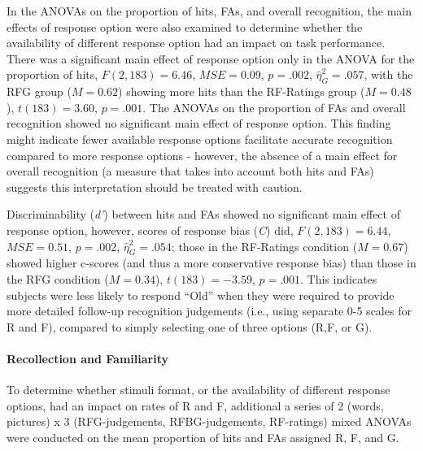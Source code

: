 \documentclass[
  11pt,
]{article}
\begin{document}
In the ANOVAs on the proportion of hits, FAs, and overall recognition,
the main effects of response option were also examined to determine
whether the availability of different response option had an impact on
task performance. There was a significant main effect of response option
only in the ANOVA for the proportion of hits, \(F(2, 183) = 6.46\),
\(\mathit{MSE} = 0.09\), \(p = .002\), \(\hat{\eta}^2_G = .057\), with
the RFG group (\(M = 0.62\)) showing more hits than the RF-Ratings group
(\(M = 0.48\)), \(t(183) = 3.60\), \(p = .001\). The ANOVAs on the
proportion of FAs and overall recognition showed no significant main
effect of response option. This finding might indicate fewer available
response options facilitate accurate recognition compared to more
response options - however, the absence of a main effect for overall
recognition (a measure that takes into account both hits and FAs)
suggests this interpretation should be treated with caution.

Discriminability (\emph{d'}) between hits and FAs showed no significant
main effect of response option, however, scores of response bias
(\emph{C}) did, \(F(2, 183) = 6.44\), \(\mathit{MSE} = 0.51\),
\(p = .002\), \(\hat{\eta}^2_G = .054\); those in the RF-Ratings
condition (\(M = 0.67\)) showed higher c-scores (and thus a more
conservative response bias) than those in the RFG condition
(\(M = 0.34\)), \(t(183) = -3.59\), \(p = .001\). This indicates
subjects were less likely to respond ``Old'' when they were required to
provide more detailed follow-up recognition judgements (i.e., using
separate 0-5 scales for R and F), compared to simply selecting one of
three options (R,F, or G).

\hypertarget{recollection-and-familiarity}{%
\paragraph{Recollection and
Familiarity}\label{recollection-and-familiarity}}

To determine whether stimuli format, or the availability of different
response options, had an impact on rates of R and F, additional a series
of 2 (words, pictures) x 3 (RFG-judgements, RFBG-judgements, RF-ratings)
mixed ANOVAs were conducted on the mean proportion of hits and FAs
assigned R, F, and G.
\end{document}
